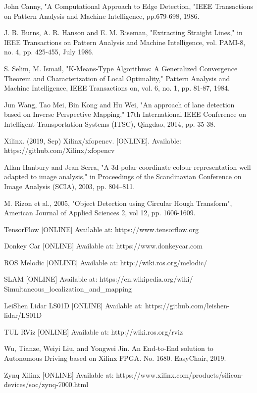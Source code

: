 \documentclass[conference]{IEEEtran}
\begin{document}
\begin{sloppypar}
\begin{thebibliography}{00}
 John Canny, "A Computational Approach to Edge Detection, "IEEE Transactions on Pattern Analysis and Machine Intelligence, pp.679-698, 1986.

 J. B. Burns, A. R. Hanson and E. M. Riseman, "Extracting Straight Lines," in IEEE Transactions on Pattern Analysis and Machine Intelligence, vol. PAMI-8, no. 4, pp. 425-455, July 1986.

 S. Selim, M. Ismail, "K-Means-Type Algorithms: A Generalized Convergence Theorem and Characterization of Local Optimality," Pattern Analysis and Machine Intelligence, IEEE Transactions on, vol. 6, no. 1, pp. 81-87, 1984. 

 Jun Wang, Tao Mei, Bin Kong and Hu Wei, "An approach of lane detection based on Inverse Perspective Mapping," 17th International IEEE Conference on Intelligent Transportation Systems (ITSC), Qingdao, 2014, pp. 35-38.

 Xilinx. (2019, Sep) Xilinx/xfopencv. [ONLINE]. Available:  https://github.com/Xilinx/xfopencv

 Allan Hanbury and Jean Serra, "A 3d-polar coordinate colour representation well adapted to image analysis," in Proceedings of the Scandinavian Conference on Image Analysis (SCIA), 2003, pp. 804–811.

 M. Rizon et al., 2005, "Object Detection using Circular Hough Transform", American Journal of Applied Sciences 2, vol 12, pp. 1606-1609.

 TensorFlow [ONLINE] Available at: https://www.tensorflow.org

 Donkey Car [ONLINE] Available at: https://www.donkeycar.com

 ROS Melodic [ONLINE] Available at: http://wiki.ros.org/melodic/

 SLAM [ONLINE] Available at: https://en.wikipedia.org/wiki/ Simultaneous\_localization\_and\_mapping

 LeiShen Lidar LS01D [ONLINE] Available at: https://github.com/leishen-lidar/LS01D

 TUL RViz [ONLINE] Available at: http://wiki.ros.org/rviz

 Wu, Tianze, Weiyi Liu, and Yongwei Jin. An End-to-End solution to Autonomous Driving based on Xilinx FPGA. No. 1680. EasyChair, 2019.

 Zynq Xilinx [ONLINE] Available at: https://www.xilinx.com/products/silicon-devices/soc/zynq-7000.html
\end{thebibliography}

\vspace{12pt}
\end{sloppypar}
\end{document}

